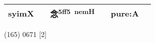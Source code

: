 \documentclass[14pt,a4paper]{scrartcl}
\begin{document}
\begin{longtable}[c]{@{}llllll@{}}
\begin{minipage}[t]{0.14\columnwidth}
syimX
\strut\end{minipage} &
\begin{minipage}[t]{0.14\columnwidth}\raggedright\strut
\strut\end{minipage} &
\begin{minipage}[t]{0.14\columnwidth}\raggedright\strut
念\textsuperscript{5ff5~nemH}
\strut\end{minipage} &
\begin{minipage}[t]{0.14\columnwidth}\raggedright\strut
\strut\end{minipage} &
\begin{minipage}[t]{0.14\columnwidth}\raggedright\strut
pure:A
\strut\end{minipage}\tabularnewline
\bottomrule
\end{longtable}

(165) 0671 {[}2{]}
\end{document}
